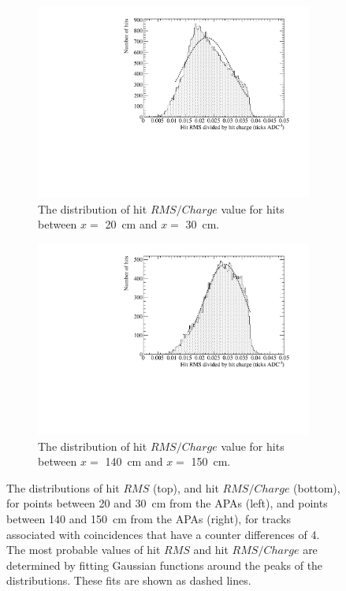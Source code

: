 \begin{figure}
\begin{subfigure}{0.48\textwidth}
    \includegraphics[width=\textwidth]{DataCan_2}
    \caption{The distribution of hit $RMS/Charge$ value for hits between $x =$ 20~cm and $x =$ 30~cm.}
    \label{fig:DiffDataHitFit_RMSQ20}
  \end{subfigure}%
  \hspace{0.03\textwidth}%
  \begin{subfigure}{0.48\textwidth}
    \centering
    \includegraphics[width=\textwidth]{DataCan_3}
    \caption{The distribution of hit $RMS/Charge$ value for hits between $x =$ 140~cm and $x =$ 150~cm.}
  \end{subfigure}
  \caption[The distributions of the $RMS$ and $RMS/Charge$ values for tracks with a counter difference of 4 in the 35 ton data]
          {The distributions of hit $RMS$ (top), and hit $RMS/Charge$ (bottom), for points between 20 and 30~cm from the APAs (left), and points between 140 and 150~cm from the APAs (right), for tracks associated with coincidences that have a counter differences of 4. The most probable values of hit $RMS$ and hit $RMS/Charge$ are determined by fitting Gaussian functions around the peaks of the distributions. These fits are shown as dashed lines.}
          \label{fig:DiffDataHitFit}
\end{figure}

